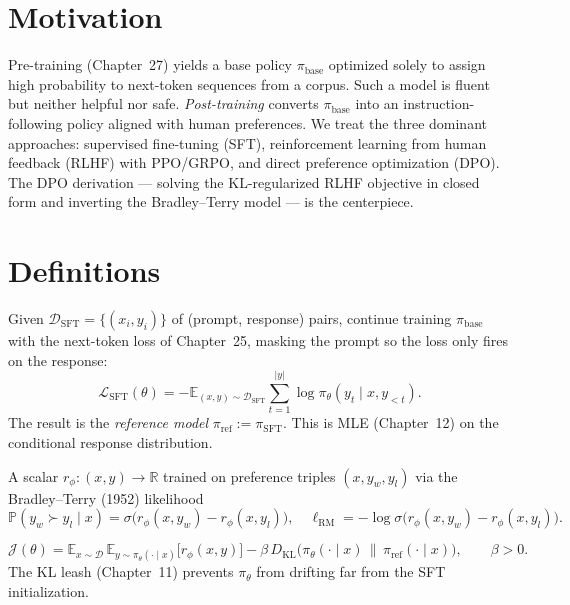 \section*{Motivation}

Pre-training (Chapter~27) yields a base policy $\pi_{\mathrm{base}}$ optimized solely to assign high probability to next-token sequences from a corpus. Such a model is fluent but neither helpful nor safe. \emph{Post-training} converts $\pi_{\mathrm{base}}$ into an instruction-following policy aligned with human preferences. We treat the three dominant approaches: supervised fine-tuning (SFT), reinforcement learning from human feedback (RLHF) with PPO/GRPO, and direct preference optimization (DPO). The DPO derivation --- solving the KL-regularized RLHF objective in closed form and inverting the Bradley--Terry model --- is the centerpiece.

\section*{Definitions}

\begin{definition}
Given $\mathcal{D}_{\mathrm{SFT}}=\{(x_i,y_i)\}$ of (prompt, response) pairs, continue training $\pi_{\mathrm{base}}$ with the next-token loss of Chapter~25, masking the prompt so the loss only fires on the response:
\[
\mathcal{L}_{\mathrm{SFT}}(\theta) = -\mathbb{E}_{(x,y)\sim\mathcal{D}_{\mathrm{SFT}}}\sum_{t=1}^{|y|}\log\pi_\theta(y_t\mid x,y_{<t}).
\]
The result is the \emph{reference model} $\pi_{\mathrm{ref}}:=\pi_{\mathrm{SFT}}$. This is MLE (Chapter~12) on the conditional response distribution.
\end{definition}

\begin{definition}
A scalar $r_\phi:(x,y)\to\mathbb{R}$ trained on preference triples $(x,y_w,y_l)$ via the Bradley--Terry (1952) likelihood
\[
\mathbb{P}(y_w\succ y_l\mid x) = \sigma\!\big(r_\phi(x,y_w)-r_\phi(x,y_l)\big),\quad
\ell_{\mathrm{RM}} = -\log\sigma\!\big(r_\phi(x,y_w)-r_\phi(x,y_l)\big).
\]
\end{definition}

\begin{definition}
\[
\mathcal{J}(\theta) = \mathbb{E}_{x\sim\mathcal{D}}\,\mathbb{E}_{y\sim\pi_\theta(\cdot\mid x)}\!\big[r_\phi(x,y)\big] - \beta\,D_{\mathrm{KL}}\!\big(\pi_\theta(\cdot\mid x)\,\|\,\pi_{\mathrm{ref}}(\cdot\mid x)\big),\qquad \beta>0.
\]
The KL leash (Chapter~11) prevents $\pi_\theta$ from drifting far from the SFT initialization.
\end{definition}

